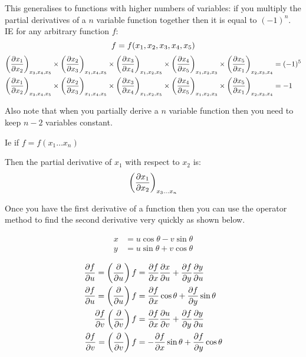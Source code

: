 \documentclass[10pt,\jkfside,a4paper]{article}
\begin{document}
This generalises to functions with higher numbers of variables: if you multiply the partial derivatives of a 
$n$ variable function together then it is equal to $(-1)^n$.\\
IE for any arbitrary function $f$:
\begin{equation}
f = f(x_1, x_2, x_3, x_4, x_5) \\
\end{equation}
\begin{equation}
\begin{split}
\left(\pdv{x_1}{x_2}\right)_{x_3, x_4, x_5} \times \left(\pdv{x_2}{x_3}\right)_{x_1, x_4, x_5} \times \left(\pdv{x_3}{x_4}\right)_{x_1, x_2, x_5} \times \left(\pdv{x_4}{x_5}\right)_{x_1, x_2, x_3} \times \left(\pdv{x_5}{x_1}\right)_{x_2, x_3, x_4} &= (-1)^5 \\
\left(\pdv{x_1}{x_2}\right)_{x_3, x_4, x_5} \times \left(\pdv{x_2}{x_3}\right)_{x_1, x_4, x_5} \times \left(\pdv{x_3}{x_4}\right)_{x_1, x_2, x_5} \times \left(\pdv{x_4}{x_5}\right)_{x_1, x_2, x_3} \times \left(\pdv{x_5}{x_1}\right)_{x_2, x_3, x_4} &= -1 \\
\end{split}
\end{equation}

Also note that when you partially derive a $n$ variable function then you need to keep $n - 2$ variables constant. 

Ie if $f = f(x_1\dots x_n)$

Then the partial derivative of $x_1$ with respect to $x_2$ is:
\begin{equation}
\left(\pdv{x_1}{x_2}\right)_{x_3\dots x_n}
\end{equation}

Once you have the first derivative of a function then you can use the operator method to find the second 
derivative very quickly as shown below.

\begin{equation}
\begin{split}
x &= u\cos\theta - v\sin\theta \\
y &= u\sin\theta + v\cos\theta \\
\end{split}
\end{equation}
\begin{equation}
\begin{split}
\pdv{f}{u} = \left(\pdv{u}\right) f &= \pdv{f}{x}\pdv{x}{u} + \pdv{f}{y}\pdv{y}{u} \\
\pdv{f}{u} = \left(\pdv{u}\right) f &= \pdv{f}{x}\cos\theta + \pdv{f}{y}\sin\theta \\
\pdv{f}{v} \left(\pdv{v}\right) f &= \pdv{f}{x}\pdv{u}{v} + \pdv{f}{y}\pdv{y}{u} \\
\pdv{f}{v} = \left(\pdv{v}\right) f &= -\pdv{f}{x}\sin\theta + \pdv{f}{y}\cos\theta \\
\end{split}
\end{equation}
\end{document}
